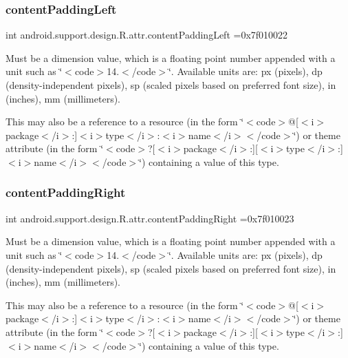 \subsubsection{\texorpdfstring{content\+Padding\+Left}{contentPaddingLeft}}
{\footnotesize\ttfamily int android.\+support.\+design.\+R.\+attr.\+content\+Padding\+Left =0x7f010022\hspace{0.3cm}{\ttfamily [static]}}

Must be a dimension value, which is a floating point number appended with a unit such as \char`\"{}$<$code$>$14.\+5sp$<$/code$>$\char`\"{}. Available units are\+: px (pixels), dp (density-\/independent pixels), sp (scaled pixels based on preferred font size), in (inches), mm (millimeters). 

This may also be a reference to a resource (in the form \char`\"{}$<$code$>$@\mbox{[}$<$i$>$package$<$/i$>$\+:\mbox{]}$<$i$>$type$<$/i$>$\+:$<$i$>$name$<$/i$>$$<$/code$>$\char`\"{}) or theme attribute (in the form \char`\"{}$<$code$>$?\mbox{[}$<$i$>$package$<$/i$>$\+:\mbox{]}\mbox{[}$<$i$>$type$<$/i$>$\+:\mbox{]}$<$i$>$name$<$/i$>$$<$/code$>$\char`\"{}) containing a value of this type. \mbox{\label{classandroid_1_1support_1_1design_1_1R_1_1attr_a054943f020d53f79ce410b9278b59a1c}} 
\subsubsection{\texorpdfstring{content\+Padding\+Right}{contentPaddingRight}}
{\footnotesize\ttfamily int android.\+support.\+design.\+R.\+attr.\+content\+Padding\+Right =0x7f010023\hspace{0.3cm}{\ttfamily [static]}}

Must be a dimension value, which is a floating point number appended with a unit such as \char`\"{}$<$code$>$14.\+5sp$<$/code$>$\char`\"{}. Available units are\+: px (pixels), dp (density-\/independent pixels), sp (scaled pixels based on preferred font size), in (inches), mm (millimeters). 

This may also be a reference to a resource (in the form \char`\"{}$<$code$>$@\mbox{[}$<$i$>$package$<$/i$>$\+:\mbox{]}$<$i$>$type$<$/i$>$\+:$<$i$>$name$<$/i$>$$<$/code$>$\char`\"{}) or theme attribute (in the form \char`\"{}$<$code$>$?\mbox{[}$<$i$>$package$<$/i$>$\+:\mbox{]}\mbox{[}$<$i$>$type$<$/i$>$\+:\mbox{]}$<$i$>$name$<$/i$>$$<$/code$>$\char`\"{}) containing a value of this type. \mbox{\label{classandroid_1_1support_1_1design_1_1R_1_1attr_aeca630891923da57bf05c2ea8d211897}} 
